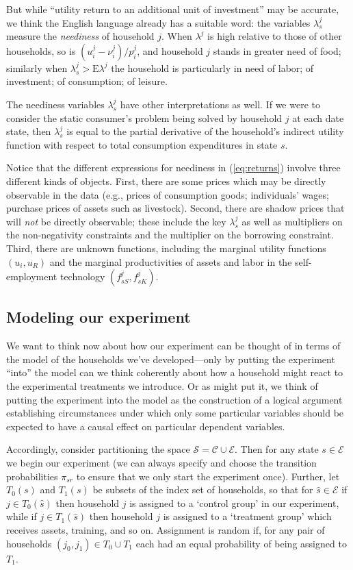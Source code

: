\documentclass[12pt,letterpaper]{article}
\newcommand{\E}{\ensuremath{\mbox{E}}}
\newcommand{\Eq}[1]{(\ref{eq:#1})}
\begin{document}
But while ``utility return to an additional unit of investment'' may
be accurate, we think the English language already has a suitable
word: the variables \(\lambda^j_s\) measure the \emph{neediness} of
household \(j\).  When \(\lambda^j\) is high relative to those of other
households, so is \((u^j_i-\nu^j_i)/p^j_i\), and household \(j\) stands in greater
need of food; similarly when \(\lambda^j_s>\E\lambda^j\) the household
is particularly in need of labor; of investment; of consumption; of
leisure. 

The neediness variables \(\lambda^j_s\) have other interpretations as
well.  If we were to consider the static consumer's problem being
solved by household \(j\) at each  date state, then \(\lambda^j_s\) is
equal to the partial derivative of the household's indirect utility
function with respect to total consumption expenditures in state \(s\).

Notice that the different expressions for neediness in \Eq{returns}
involve three different kinds of objects.  First, there are some
prices which may be directly observable in the data (e.g., prices of
consumption goods; individuals' wages; purchase prices of assets such
as livestock).  Second, there are shadow prices that will \emph{not}
be directly observable; these include the key \(\lambda^j_s\) as well as
multipliers on the non-negativity constraints and the multiplier on
the borrowing constraint.  Third, there are unknown functions,
including the marginal utility functions \((u_i,u_R)\) and the marginal
productivities of assets and labor in the self-employment technology
\((f^j_{sS},f^j_{sK})\).

\subsection{Modeling our experiment}
\label{sec:orgheadline9}

We want to think now about how our experiment can be thought of in
terms of the model of the households we've developed---only by putting
the experiment ``into'' the model can we think coherently about how a
household might react to the experimental treatments we introduce.  Or
as \cite{Rubin74} might put it, we think of putting the experiment
into the model as the construction of a logical argument establishing
circumstances under which only some particular variables should be
expected to have a causal effect on particular dependent variables.

Accordingly, consider partitioning the space
\(\mathcal{S}=\mathcal{C}\cup\mathcal{E}\).  Then for any state
\(s\in\mathcal{E}\) we begin our experiment (we can always specify
 and choose the transition probabilities \(\pi_{sr}\) to
ensure that we only start the experiment once).  Further, let \(T_0(s)\)
and \(T_1(s)\) be subsets of the index set of households, so that for
\(\hat s\in\mathcal{E}\) if \(j\in T_0(\hat s)\) then household \(j\) is
assigned to a `control group' in our experiment, while if \(j\in
T_1(\hat s)\) then household \(j\) is assigned to a `treatment group'
which receives assets, training, and so on.  Assignment is random if,
for any pair of households \((j_0,j_1)\in T_0\cup T_1\) each had an
equal probability of being assigned to \(T_1\).
\end{document}
